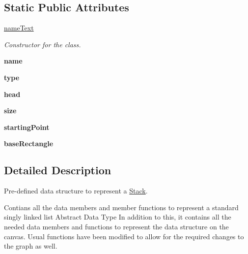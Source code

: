 \subsection*{Static Public Attributes}
\begin{DoxyCompactItemize}
\item 
\hyperlink{class_stack_1_1_stack_a6da1cd9f8ad12a4158b548580bc8cb06}{name\+Text}
\begin{DoxyCompactList}\small\item\em Constructor for the class. \end{DoxyCompactList}\item 
\mbox{\label{class_stack_1_1_stack_a816d228643737425943f5b3dcff47752}} 
{\bfseries name}
\item 
\mbox{\label{class_stack_1_1_stack_a04ed642405fc7683813607a2383ccd12}} 
{\bfseries type}
\item 
\mbox{\label{class_stack_1_1_stack_a8726f351e5a08290fa4481dfdd06dbd5}} 
{\bfseries head}
\item 
\mbox{\label{class_stack_1_1_stack_a88efefb17bc788be77ef8259f157b011}} 
{\bfseries size}
\item 
\mbox{\label{class_stack_1_1_stack_aff1a82eee850725bb5585d7a07b1f0ec}} 
{\bfseries starting\+Point}
\item 
\mbox{\label{class_stack_1_1_stack_ad6677753e14b1bbd2a8d464ed9d5cbac}} 
{\bfseries base\+Rectangle}
\end{DoxyCompactItemize}


\subsection{Detailed Description}
Pre-\/defined data structure to represent a \hyperlink{class_stack_1_1_stack}{Stack}. 

Contians all the data members and member functions to represent a standard singly linked list Abstract Data Type In addition to this, it contains all the needed data members and functions to represent the data structure on the canvas. Usual functions have been modified to allow for the required changes to the graph as well. 

